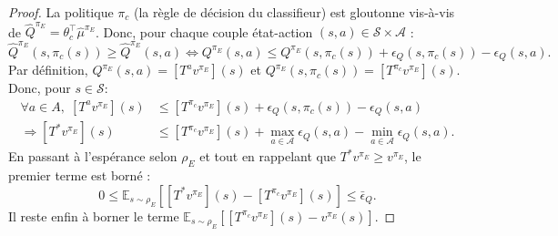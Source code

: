 \documentclass[french,utf8]{./hermes-journal}
\newcommand{\s}{\mathcal{S}}
\newcommand{\A}{\mathcal{A}}
\newcommand{\E}{\mathbb{E}}
\begin{document}
\begin{proof}
  La politique $\pi_c$ (la règle de décision du classifieur) est gloutonne vis-à-vis de 
  $\hat{Q}^{\pi_E}=\theta_c^\top\hat{\mu}^{\pi_E}$. Donc, pour chaque couple état-action
  $(s,a)\in\s\times \A$ :
  \begin{equation}
    \hat{Q}^{\pi_E}(s,\pi_c(s))\geq
    \hat{Q}^{\pi_E}(s,a)
    \Leftrightarrow
    Q^{\pi_E}(s,a) \leq Q^{\pi_E}(s,\pi_c(s)) +
    \epsilon_Q(s,\pi_c(s)) - \epsilon_Q(s,a).
  \end{equation}
  Par définition, $Q^{\pi_E}(s,a) = [T^a v^{\pi_E}](s)$ et
  $Q^{\pi_E}(s,\pi_c(s)) = [T^{\pi_c} v^{\pi_E}](s)$. Donc, pour $s\in\s$:
  \begin{align}
    \forall a\in A,\; [T^a v^{\pi_E}](s) &\leq [T^{\pi_c}
    v^{\pi_E}](s) + \epsilon_Q(s,\pi_c(s))-\epsilon_Q(s,a)
    \\
    \Rightarrow [T^* v^{\pi_E}](s) &\leq [T^{\pi_c}
    v^{\pi_E}](s) + \max_{a\in \A}\epsilon_Q(s,a)-\min_{a\in
    \A}\epsilon_Q(s,a).
  \end{align}
  En passant à l'espérance selon $\rho_E$ et tout en rappelant que 
  $T^* v^{\pi_E}\geq v^{\pi_E}$, le premier terme est borné :
  \begin{equation}
    0 \leq \E_{s\sim\rho_E}\left[ [T^* v^{\pi_E}](s) - [T^{\pi_c}
    v^{\pi_E}](s)\right] \leq \bar{\epsilon}_Q.
    \label{eroo1}
  \end{equation}
  Il reste enfin à borner le terme $\E_{s\sim\rho_E}[[T^{\pi_c}v^{\pi_E}](s) -
  v^{\pi_E}(s)]$.


\end{proof}
\end{document}
